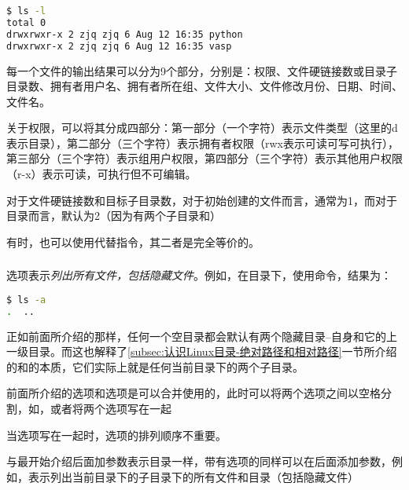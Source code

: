 \begin{lstlisting}[language=bash]
$ ls -l
total 0
drwxrwxr-x 2 zjq zjq 6 Aug 12 16:35 python
drwxrwxr-x 2 zjq zjq 6 Aug 12 16:35 vasp
\end{lstlisting}

\begin{extend}
每一个文件的输出结果可以分为9个部分，分别是：权限、文件硬链接数或目录子目录数、拥有者用户名、拥有者所在组、文件大小、文件修改月份、日期、时间、文件名。

关于权限，可以将其分成四部分：第一部分（一个字符）表示文件类型（这里的d表示目录），第二部分（三个字符）表示拥有者权限（rwx表示可读可写可执行），第三部分（三个字符）表示组用户权限，第四部分（三个字符）表示其他用户权限（r-x）表示可读，可执行但不可编辑。

对于文件硬链接数和目标子目录数，对于初始创建的文件而言，通常为1，而对于目录而言，默认为2（因为有两个子目录和）
\end{extend}

有时，也可以使用代替指令，其二者是完全等价的。

\subsubsection{}

选项表示\emph{列出所有文件，包括隐藏文件}。例如，在目录下，使用命令，结果为：

\begin{lstlisting}[language=bash]
$ ls -a
.  ..
\end{lstlisting}

\begin{extend}
    正如前面所介绍的那样，任何一个空目录都会默认有两个隐藏目录--自身和它的上一级目录。而这也解释了\ref{subsec:认识Linux目录-绝对路径和相对路径}一节所介绍的和的本质，它们实际上就是任何当前目录下的两个子目录。
\end{extend}

\begin{attention}
    前面所介绍的选项和选项是可以合并使用的，此时可以将两个选项之间以空格分割，如，或者将两个选项写在一起

    当选项写在一起时，选项的排列顺序不重要。

    与最开始介绍后面加参数表示目录一样，带有选项的同样可以在后面添加参数，例如，表示列出当前目录下的子目录下的所有文件和目录（包括隐藏文件）
\end{attention}

